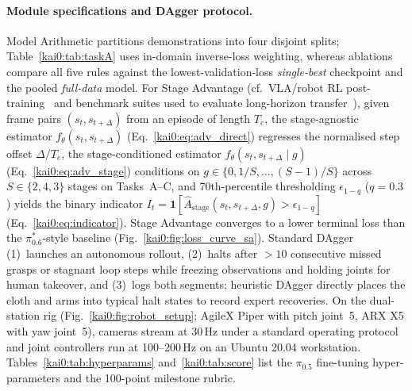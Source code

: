 \paragraph{Module specifications and DAgger protocol.}
Model Arithmetic partitions demonstrations into four disjoint splits; Table~\ref{kai0:tab:taskA} uses in-domain inverse-loss weighting, whereas ablations compare all five rules against the lowest-validation-loss \emph{single-best} checkpoint and the pooled \emph{full-data} model. For Stage Advantage (cf.\ VLA/robot RL post-training~\cite{chen2025tgrpo,li2025simplevla,lu2025vla,luo2024serl,xiao2025PLD,luo2025hilserl,lei2025rl,kumar2019reward,frans2025diffusion,ghasemipour2025self,zhai2025vlac,zhang2025rewind,ma2024gvl,sutton1998reinforcement,schulman2017PPO,wagenmaker2025dsrl} and benchmark suites used to evaluate long-horizon transfer~\cite{mees2022calvin,mu2025robotwin,liu2023libero}), given frame pairs $(s_t, s_{t+\Delta})$ from an episode of length $T_e$, the stage-agnostic estimator $f_{\theta}(s_t, s_{t+\Delta})$ (Eq.~\eqref{kai0:eq:adv_direct}) regresses the normalised step offset $\Delta / T_e$, the stage-conditioned estimator $f_{\theta}(s_t, s_{t+\Delta} \mid g)$ (Eq.~\eqref{kai0:eq:adv_stage}) conditions on $g \in \{0, 1/S, \dots, (S-1)/S\}$ across $S \in \{2, 4, 3\}$ stages on Tasks~A--C, and 70th-percentile thresholding $\epsilon_{1-q}$ ($q = 0.3$) yields the binary indicator $I_t = \mathbf{1}[\hat{A}_{\mathrm{stage}}(s_t, s_{t+\Delta}, g) > \epsilon_{1-q}]$ (Eq.~\eqref{kai0:eq:indicator}). Stage Advantage converges to a lower terminal loss than the $\pi^{*}_{0.6}$-style baseline (Fig.~\ref{kai0:fig:loss_curve_sa}). Standard DAgger (1)~launches an autonomous rollout, (2)~halts after $>10$ consecutive missed grasps or stagnant loop steps while freezing observations and holding joints for human takeover, and (3)~logs both segments; heuristic DAgger directly places the cloth and arms into typical halt states to record expert recoveries. On the dual-station rig (Fig.~\ref{kai0:fig:robot_setup}; AgileX Piper with pitch joint~5, ARX X5 with yaw joint~5), cameras stream at 30\,Hz under a standard operating protocol and joint controllers run at 100--200\,Hz on an Ubuntu 20.04 workstation. Tables~\ref{kai0:tab:hyperparams} and~\ref{kai0:tab:score} list the $\pi_{0.5}$ fine-tuning hyper-parameters and the 100-point milestone rubric.

